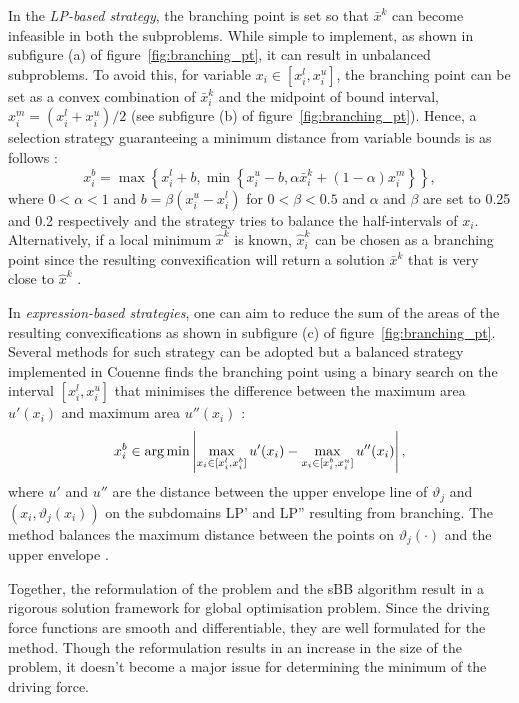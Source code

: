 \begin{enumerate}
\begin{enumerate}
		In the \emph{LP-based strategy}, the branching point is set so that $\bar{x}^k$ can become infeasible in both the subproblems. While simple to implement, as shown in subfigure (a) of figure~\ref{fig:branching_pt}, it can result in unbalanced subproblems. To avoid this, for variable $x_i \in [x_i^l, x_i^u]$, the branching point can be set as a convex combination of $\bar{x}_i^k$ and the midpoint of bound interval, $x_i^m = (x_i^l + x_i^u) / 2$ (see subfigure (b) of figure~\ref{fig:branching_pt}). Hence, a selection strategy guaranteeing a minimum distance from variable bounds is as follows \cite{Tawarmalani:2013aa}:
		\[
			x_i^b = \max \left \{x_i^l +b, \min \left \{x_i^u -b, \alpha \bar{x}_i^k + \left(1-\alpha\right)x_i^m \right \} \right \},
		\]
		where $0 < \alpha < 1$ and $b = \beta(x_i^u - x_i^l)$ for $0 < \beta < 0.5$ and $\alpha$ and $\beta$ are set to \num{0.25} and \num{0.2} respectively \cite{Belotti:2009aa} and  the strategy tries to balance the half-intervals of $x_i$. Alternatively, if a local minimum $\hat{x}^k$ is known, $\hat{x}_i^k$ can be chosen as a branching point since the resulting convexification will return a solution $\bar{x}^k$ that is very close to $\hat{x}^k$ \cite{Shectman:1998aa}.
		
	In \emph{expression-based strategies}, one can aim to reduce the sum of the areas of the resulting convexifications as shown in subfigure (c) of figure~\ref{fig:branching_pt}. Several methods for such strategy can be adopted \cite{Kalantari:1987aa,Liu:1996aa} but a balanced strategy implemented in Couenne finds the branching point using a binary search on the interval $[x_i^l, x_i^u]$ that minimises the difference between the maximum area $u'(x_i)$ and maximum area $u''(x_i)$ \cite{Belotti:2009aa}:
	\[
		x_i^b \in \operatorname*{arg\,min} \left | \max_{x_i \in [x_i^l, x_i^b]} u'(x_i) - \max_{x_i \in [x_i^b, x_i^u]} u''(x_i) \right|,
	\]
	where $u'$ and $u''$ are the distance between the upper envelope line of $\vartheta_j$ and $(x_i, \vartheta_j(x_i))$ on the subdomains LP' and LP'' resulting from branching. The method balances the maximum distance between the points on $\vartheta_j(\cdot)$ and the upper envelope \cite{Belotti:2022aa}.
		\end{enumerate}	
\end{enumerate}

	  Together, the reformulation of the problem and the sBB algorithm result in a rigorous solution framework for global optimisation problem. Since the driving force functions are smooth and differentiable, they are well formulated for the method. Though the reformulation results in an increase in the size of the problem, it doesn't become a major issue for determining the minimum of the driving force.
	  
